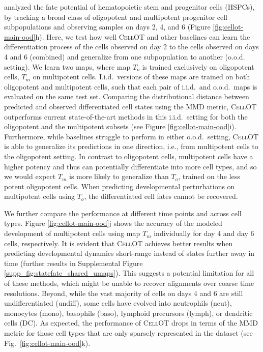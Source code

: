 \citet{weinreb2020} analyzed the fate potential of hematopoietic stem and progenitor cells (HSPCs), by tracking a broad class of oligopotent %
and multipotent %
progenitor cell subpopulations and observing samples on days 2, 4, and 6 (Figure \ref{fig:cellot-main-ood}h).
Here, we test how well \textsc{CellOT} and other baselines can learn the differentiation process of the cells observed on day 2 to the cells observed on days 4 and 6 (combined) and generalize from one subpopulation to another (o.o.d. setting).
We learn two maps, where map $T_o$ is trained exclusively on oligopotent cells, $T_m$ on multipotent cells.
I.i.d.~versions of these maps are trained on both oligopotent and multipotent cells, such that each pair of i.i.d.~and o.o.d.~maps is evaluated on the same test set.
Comparing the distributional distance between predicted and observed differentiated cell states using the MMD metric, \textsc{CellOT} outperforms current state-of-the-art methods in this i.i.d.~setting for both the oligopotent and the multipotent subsets (see Figure \ref{fig:cellot-main-ood}i).
Furthermore, while baselines struggle to perform in either o.o.d.~setting, \textsc{CellOT} is able to generalize its predictions in one direction, i.e., from multipotent cells to the oligopotent setting.
In contrast to oligopotent cells, multipotent cells have a higher potency and thus can potentially differentiate into more cell types, and so we would expect $T_m$ is more likely to generalize than $T_o$, trained on the less potent oligopotent cells.
When predicting developmental perturbations on multipotent cells using $T_o$, the differentiated cell fates cannot be recovered.

We further compare the performance at different time points and across cell types.
Figure \ref{fig:cellot-main-ood}j shows the accuracy of the modeled development of multipotent cells using map $T_m$ individually for day 4 and day 6 cells, respectively.
It is evident that \textsc{CellOT} achieves better results when predicting developmental dynamics short-range instead of states further away in time (further results in Supplemental Figure \ref{supp_fig:statefate_shared_umaps}).
This suggests a potential limitation for all of these methods, which might be unable to recover alignments over coarse time resolutions.
Beyond, while the vast majority of cells on days 4 and 6 are still undifferentiated (undiff), some cells have evolved into neutrophils (neut), monocytes (mono), basophils (baso), lymphoid precursors (lymph), or dendritic cells (DC).
As expected, the performance of \textsc{CellOT} drops in terms of the MMD metric for those cell types that are only sparsely represented in the dataset (see Fig.~\ref{fig:cellot-main-ood}k).
